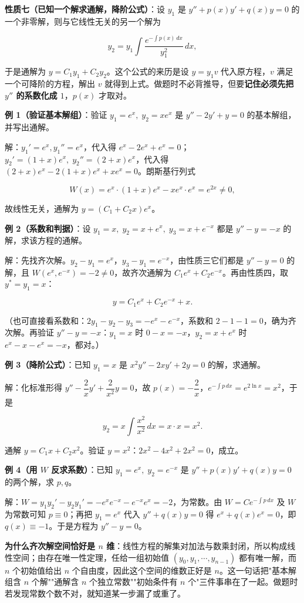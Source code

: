 \documentclass[11pt,openany,UTF8]{ctexbook}
\begin{document}
\textbf{性质七（已知一个解求通解，降阶公式）}：设 $y_1$ 是 $y''+p(x)y'+q(x)y=0$ 的一个非零解，则与它线性无关的另一个解为

\[y_2=y_1\int\frac{e^{-\int p(x)\,dx}}{y_1^{2}}\,dx,\]

于是通解为 $y=C_1y_1+C_2y_2$。这个公式的来历是设 $y=y_1v$ 代入原方程，$v$ 满足一个可降阶的方程，解出 $v$ 就得到上式。做题时不必背推导，但要\textbf{记住必须先把 $y''$ 的系数化成 $1$}，$p(x)$ 才取对。

\textbf{例 1（验证基本解组）}：验证 $y_1=e^{x},\;y_2=xe^{x}$ 是 $y''-2y'+y=0$ 的基本解组，并写出通解。

解：$y_1'=e^{x},y_1''=e^{x}$，代入得 $e^{x}-2e^{x}+e^{x}=0$；$y_2'=(1+x)e^{x},\;y_2''=(2+x)e^{x}$，代入得 $(2+x)e^{x}-2(1+x)e^{x}+xe^{x}=0$。朗斯基行列式

\[W(x)=e^{x}\cdot(1+x)e^{x}-xe^{x}\cdot e^{x}=e^{2x}\ne 0,\]

故线性无关，通解为 $y=(C_1+C_2x)e^{x}$。

\textbf{例 2（系数和判据）}：设 $y_1=x,\;y_2=x+e^{x},\;y_3=x+e^{-x}$ 都是 $y''-y=-x$ 的解，求该方程的通解。

解：先找齐次解。$y_2-y_1=e^{x}$，$y_3-y_1=e^{-x}$，由性质三它们都是 $y''-y=0$ 的解，且 $W(e^{x},e^{-x})=-2\ne 0$，故齐次通解为 $C_1e^{x}+C_2e^{-x}$。再由性质四，取 $y^{*}=y_1=x$：

\[y=C_1e^{x}+C_2e^{-x}+x .\]

（也可直接看系数和：$2y_1-y_2-y_3=-e^{x}-e^{-x}$，系数和 $2-1-1=0$，确为齐次解。再验证 $y''-y=-x$：$y_1=x$ 时 $0-x=-x$，$y_2=x+e^{x}$ 时 $e^{x}-x-e^{x}=-x$，都对。）

\textbf{例 3（降阶公式）}：已知 $y_1=x$ 是 $x^{2}y''-2xy'+2y=0$ 的解，求通解。

解：化标准形得 $y''-\dfrac2xy'+\dfrac{2}{x^{2}}y=0$，故 $p(x)=-\dfrac2x$，$e^{-\int p\,dx}=e^{2\ln x}=x^{2}$，于是

\[y_2=x\int\frac{x^{2}}{x^{2}}\,dx=x\cdot x=x^{2}.\]

通解 $y=C_1x+C_2x^{2}$。验证 $y=x^{2}$：$2x^{2}-4x^{2}+2x^{2}=0$，成立。

\textbf{例 4（用 $W$ 反求系数）}：已知 $y_1=e^{x},\;y_2=e^{-x}$ 是 $y''+p(x)y'+q(x)y=0$ 的两个解，求 $p,q$。

解：$W=y_1y_2'-y_2y_1'=-e^{x}e^{-x}-e^{-x}e^{x}=-2$，为常数。由 $W=Ce^{-\int p\,dx}$ 及 $W$ 为常数可知 $p\equiv 0$；再把 $y_1=e^{x}$ 代入 $y''+q(x)y=0$ 得 $e^{x}+q(x)e^{x}=0$，即 $q(x)\equiv -1$。于是方程为 $y''-y=0$。

\textbf{为什么齐次解空间恰好是 $n$ 维}：线性方程的解集对加法与数乘封闭，所以构成线性空间；由存在唯一性定理，任给一组初始值 $\left(y_0,y_1,\cdots,y_{n-1}\right)$ 都有唯一解，而 $n$ 个初始值给出 $n$ 个自由度，因此这个空间的维数正好是 $n$。这一句话把"基本解组含 $n$ 个解""通解含 $n$ 个独立常数""初始条件有 $n$ 个"三件事串在了一起。做题时若发现常数个数不对，就知道某一步漏了或重了。
\end{document}
